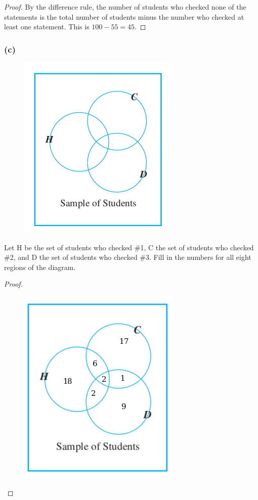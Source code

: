 \documentclass[14pt]{extarticle}
\begin{document}
\begin{proof}
By the difference rule, the number of students who checked none of the statements is the total number of students 
minus the number who checked at least one statement. This is \(100 - 55 = 45\).
\end{proof}

\subsubsection{(c)}
\begin{figure}[ht!]
\centering
\includegraphics[scale=0.5]{../images/9.3.33.c.1.png}
\end{figure}

Let H be the set of students who checked \#1, C the set of students who checked \#2, and D the set of students who 
checked \#3. Fill in the numbers for all eight regions of the diagram.

\begin{proof}
\begin{figure}[ht!]
\centering
\includegraphics[scale=0.5]{../images/9.3.33.c.2.png}
\end{figure}
\end{proof}
\end{document}
